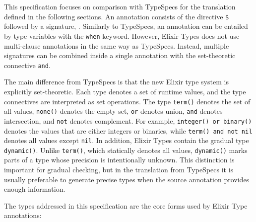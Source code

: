 This specification focuses on comparison with TypeSpecs for the translation defined in the following sections.
An annotation consists of the directive \texttt{\$} followed by a signature, \ETS.
Similarly to TypeSpecs, an annotation can be entailed by type variables with the \texttt{when} keyword.
However, Elixir Types does not use multi-clause annotations in the same way as TypeSpecs.
Instead, multiple signatures can be combined inside a single annotation with the set-theoretic connective \texttt{and}.

The main difference from TypeSpecs is that the new Elixir type system is explicitly set-theoretic.
Each type denotes a set of runtime values, and the type connectives are interpreted as set operations.
The type \texttt{term()} denotes the set of all values, \texttt{none()} denotes the empty set, \texttt{or} denotes union, \texttt{and} denotes intersection, and \texttt{not} denotes complement.
For example, \texttt{integer() or binary()} denotes the values that are either integers or binaries, while \texttt{term() and not nil} denotes all values except \texttt{nil}.
In addition, Elixir Types contain the gradual type \texttt{dynamic()}.
Unlike \texttt{term()}, which statically denotes all values, \texttt{dynamic()} marks parts of a type whose precision is intentionally unknown.
This distinction is important for gradual checking, but in the translation from TypeSpecs it is usually preferable to generate precise types when the source annotation provides enough information.

The types addressed in this specification are the core forms used by Elixir Type annotations:

